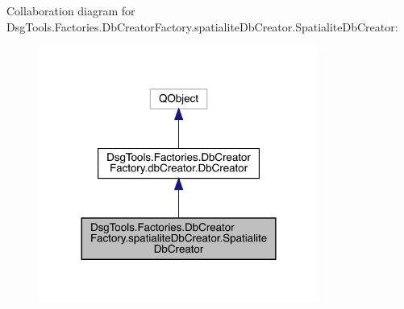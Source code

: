 Collaboration diagram for Dsg\+Tools.\+Factories.\+Db\+Creator\+Factory.\+spatialite\+Db\+Creator.\+Spatialite\+Db\+Creator\+:
\nopagebreak
\begin{figure}[H]
\begin{center}
\leavevmode
\includegraphics[width=260pt]{class_dsg_tools_1_1_factories_1_1_db_creator_factory_1_1spatialite_db_creator_1_1_spatialite_db_creator__coll__graph}
\end{center}
\end{figure}
